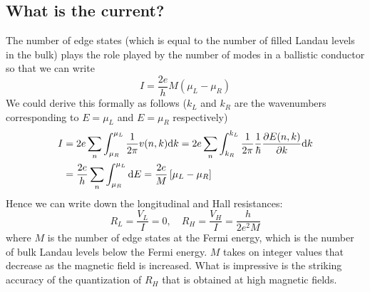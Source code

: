 \documentclass[11pt,a4paper]{book}
\theoremstyle{plain}
\theoremstyle{definition}
\theoremstyle{remark}
\begin{document}
\subsection{What is the current?}
The number of edge states (which is equal to the number of filled Landau levels in the bulk) plays the role played by the number of modes in a ballistic conductor so that we can write
\begin{equation}
    I = \frac{2 e}{h} M (\mu_L - \mu_R)
\end{equation}
We could derive this formally as follows ($k_L$ and $k_R$ are the wavenumbers corresponding to $E = \mu_L$ and $E = \mu_R$ respectively)
\begin{equation}
    \begin{aligned}
        I & = 2e \sum_n \int^{\mu_L}_{\mu_R} \frac{1}{2 \pi}v(n,k)\dd k = 2e\sum_n \int^{k_L}_{k_R} \frac{1}{2 \pi} \frac{1}{\hbar} \pdv{E(n,k)}{k} \dd k \\
        & = \frac{2 e}{h} \sum_n \int^{\mu_L}_{\mu_R} \dd E = \frac{2 e}M\left[ \mu_L - \mu_R \right]
    \end{aligned}
\end{equation}
Hence we can write down the longitudinal and Hall resistances:
\begin{equation}
    R_L = \frac{V_L}{I} = 0, \quad R_H = \frac{V_H}{I} = \frac{h}{2 e^2 M}
\end{equation}
where $M$ is the number of edge states at the Fermi energy, which is the number of bulk Landau levels below the Fermi energy. $M$ takes on integer values that decrease as the magnetic field is increased. What is impressive is the striking accuracy of the quantization of $R_H$ that is obtained at high magnetic fields.
\end{document}
